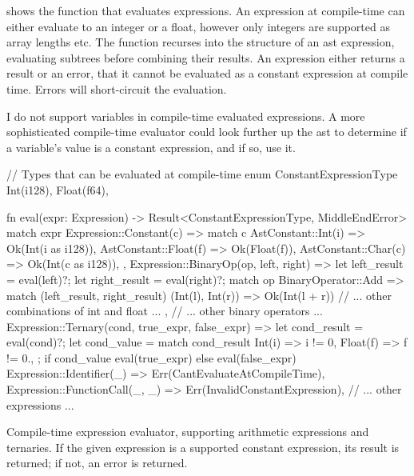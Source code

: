 \documentclass[../00-main.tex]{subfiles}
\begin{document}
 shows the function that evaluates expressions.
An expression at compile-time can either evaluate to an integer or a float, however only integers are supported as array lengths etc.
The  function recurses into the structure of an \gls{ast} expression, evaluating subtrees before combining their results.
An expression either returns a result or an error, that it cannot be evaluated as a constant expression at compile time.
Errors will short-circuit the evaluation.

I do not support variables in compile-time evaluated expressions.
A more sophisticated compile-time evaluator could look further up the \gls{ast} to determine if a variable's value is a constant expression, and if so, use it.

\begin{listing}[!t]
  \begin{RustListing}
    // Types that can be evaluated at compile-time
    enum ConstantExpressionType {
        Int(i128),
        Float(f64),
    }

    fn eval(expr: Expression) -> Result<ConstantExpressionType, MiddleEndError> {
        match expr {
            Expression::Constant(c) => match c {
                AstConstant::Int(i) => Ok(Int(i as i128)),
                AstConstant::Float(f) => Ok(Float(f)),
                AstConstant::Char(c) => Ok(Int(c as i128)),
            },
            Expression::BinaryOp(op, left, right) => {
                let left_result = eval(left)?;
                let right_result = eval(right)?;
                match op {
                    BinaryOperator::Add => match (left_result, right_result) {
                        (Int(l), Int(r)) => {
                            Ok(Int(l + r))
                        }
                        // ... other combinations of int and float ...
                    },
                    // ... other binary operators ...
                }
            }
            Expression::Ternary(cond, true_expr, false_expr) => {
                let cond_result = eval(cond)?;
                let cond_value = match cond_result {
                    Int(i) => i != 0,
                    Float(f) => f != 0.,
                };
                if cond_value {
                    eval(true_expr)
                } else {
                    eval(false_expr)
                }
            }
            Expression::Identifier(_) => Err(CantEvaluateAtCompileTime),
            Expression::FunctionCall(_, _) => Err(InvalidConstantExpression),
            // ... other expressions ...
        }
    }
  \end{RustListing}
  \caption{Compile-time expression evaluator, supporting arithmetic expressions and ternaries. If the given expression is a supported constant expression, its result is returned; if not, an error is returned.}
  \label{app:lst:compile time expression evaluator}
\end{listing}
\end{document}
